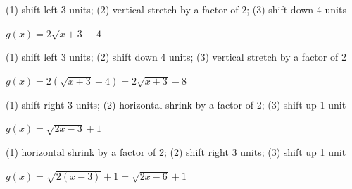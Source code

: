 \documentclass{ximera}
\begin{document}
\begin{question}
\begin{problem}
(1) shift left 3 units; (2) vertical stretch by a factor of 2; (3) shift down 4 units

\begin{solution}
    $g(x) = 2\sqrt{x+3} - 4$
\end{solution}
\end{problem}

\begin{problem}
(1) shift left 3 units; (2) shift down 4 units; (3) vertical stretch by a factor of 2

\begin{solution}
    $g(x) = 2\left(\sqrt{x+3} - 4\right) = 2\sqrt{x+3} - 8$
\end{solution}
\end{problem}

\begin{problem}
(1) shift right 3 units; (2) horizontal shrink by a factor of 2; (3) shift up 1 unit

\begin{solution}
    $g(x) = \sqrt{2x-3} + 1$
\end{solution}
\end{problem}

\begin{problem}
(1) horizontal shrink by a factor of 2; (2) shift right 3 units; (3) shift up 1 unit

\begin{solution}
    $g(x) = \sqrt{2(x-3)} + 1 = \sqrt{2x-6}+1$
\end{solution}
\end{problem}
\end{question}
\end{document}
